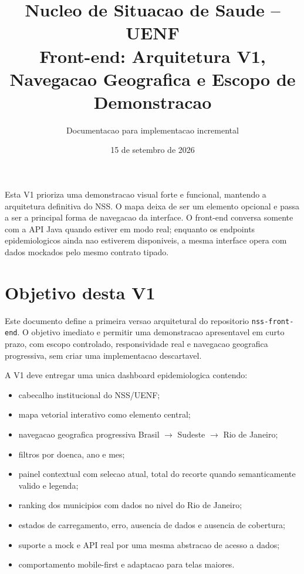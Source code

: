 \documentclass[12pt,a4paper]{article}
\title{\textbf{Nucleo de Situacao de Saude -- UENF}\\[0.4cm]
\Large Front-end: Arquitetura V1, Navegacao Geografica e Escopo de Demonstracao}
\author{Documentacao para implementacao incremental}
\date{15 de setembro de 2026}
\begin{document}
\maketitle
\thispagestyle{empty}
\vfill

\begin{decision}
Esta V1 prioriza uma demonstracao visual forte e funcional, mantendo a arquitetura definitiva do NSS. O mapa deixa de ser um elemento opcional e passa a ser a principal forma de navegacao da interface. O front-end conversa somente com a API Java quando estiver em modo real; enquanto os endpoints epidemiologicos ainda nao estiverem disponiveis, a mesma interface opera com dados mockados pelo mesmo contrato tipado.
\end{decision}

\vfill
\newpage
\tableofcontents
\newpage

\section{Objetivo desta V1}

Este documento define a primeira versao arquitetural do repositorio \texttt{nss-front-end}. O objetivo imediato e permitir uma demonstracao apresentavel em curto prazo, com escopo controlado, responsividade real e navegacao geografica progressiva, sem criar uma implementacao descartavel.

A V1 deve entregar uma unica dashboard epidemiologica contendo:

\begin{itemize}[leftmargin=*]
    \item cabecalho institucional do NSS/UENF;
    \item mapa vetorial interativo como elemento central;
    \item navegacao geografica progressiva Brasil $\rightarrow$ Sudeste $\rightarrow$ Rio de Janeiro;
    \item filtros por doenca, ano e mes;
    \item painel contextual com selecao atual, total do recorte quando semanticamente valido e legenda;
    \item ranking dos municipios com dados no nivel do Rio de Janeiro;
    \item estados de carregamento, erro, ausencia de dados e ausencia de cobertura;
    \item suporte a mock e API real por uma mesma abstracao de acesso a dados;
    \item comportamento mobile-first e adaptacao para telas maiores.
\end{itemize}
\end{document}
